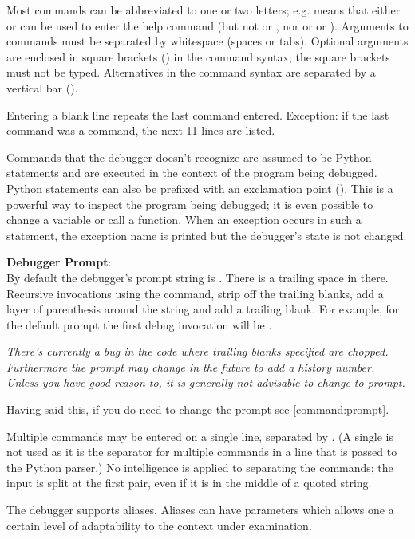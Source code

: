 Most commands can be abbreviated to one or two letters;
e.g.  means that either  or  can be
used to enter the help command (but not  or , nor
 or  or ).  Arguments to commands must
be separated by whitespace (spaces or tabs).  Optional arguments are
enclosed in square brackets (\samp{[]}) in the command syntax; the
square brackets must not be typed.  Alternatives in the command syntax
are separated by a vertical bar (\samp{|}).

Entering a blank line repeats the last command entered.  Exception: if
the last command was a  command, the next 11 lines are
listed.

Commands that the debugger doesn't recognize are assumed to be Python
statements and are executed in the context of the program being
debugged.  Python statements can also be prefixed with an exclamation
point (\samp{!}).  This is a powerful way to inspect the program being
debugged; it is even possible to change a variable or call a function.
When an exception occurs in such a statement, the exception name is
printed but the debugger's state is not changed.

{\bf Debugger Prompt}:\label{debugger-prompt}\\
By default the debugger's prompt string is . There
is a trailing space in there. Recursive invocations using the
 command, strip off the trailing blanks, add a layer of
parenthesis around the string and add a trailing blank. For example,
for the default prompt the first debug invocation will be
.

\emph{There's currently a bug in the code where trailing blanks
specified are chopped. Furthermore the prompt may change in the future
to add a history number. Unless you have good reason to, it is
generally not advisable to change to prompt.}

Having said this, if you do need to change the prompt see
\ref{command:prompt}.


Multiple commands may be entered on a single line, separated by
\samp{;;}.  (A single \samp{;} is not used as it is
the separator for multiple commands in a line that is passed to
the Python parser.)
No intelligence is applied to separating the commands;
the input is split at the first \samp{;;} pair, even if it is in
the middle of a quoted string.

The debugger supports aliases.  Aliases can have parameters which
allows one a certain level of adaptability to the context under
examination.


